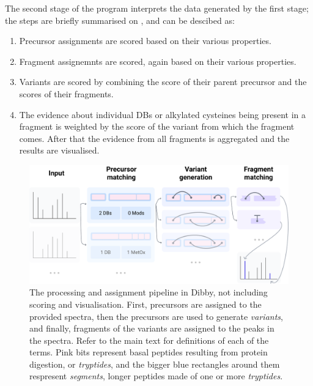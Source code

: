 The second stage of the program interprets the data generated by the first stage; the steps are briefly summarised on , and can be descibed as:

\begin{enumerate}
  \item Precursor assignments are scored based on their various properties.
  \item Fragment assignemnts are scored, again based on their various properties.
  \item Variants are scored by combining the score of their parent precursor and the scores of their fragments.
  \item The evidence about individual DBs or alkylated cysteines being present in a fragment is weighted by the score of the variant from which the fragment comes. After that the evidence from all fragments is aggregated and the results are visualised.
\end{enumerate}


\begin{figure}
  \centering
  \includegraphics[width=\linewidth]{img/pipeline.pdf}
  \caption{The processing and assignment pipeline in Dibby, not including scoring and visualisation. First, precursors are assigned to the provided spectra, then the precursors are used to generate \emph{variants}, and finally, fragments of the variants are assigned to the peaks in the spectra. Refer to the main text for definitions of each of the terms. Pink bits represent basal peptides resulting from protein digestion, or \emph{tryptides}, and the bigger blue rectangles around them respresent \emph{segments}, longer peptides made of one or more \emph{tryptides}.}\label{fig:pipeline}

\end{figure}


